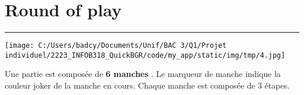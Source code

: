 \documentclass{scrartcl}%
\begin{document}
%
\sectionfont{\color{mygreen}}%
\subsectionfont{\color{mygreen}}%
\subsubsectionfont{\color{mygreen}}%
\section{ Round of play
}%
\label{sec:Roundofplay}%
\textcolor{mygreen}{\rule{18cm}{0.07cm}}\break%
%
\begin{center}\texttt{[image: C:/Users/badcy/Documents/Unif/BAC 3/Q1/Projet individuel/2223\_INFOB318\_QuickBGR/code/my\_app/static/img/tmp/4.jpg]}\end{center}%

%
Une partie est composée de %
\textcolor{mygreen}{%
\textbf{6 manches}%
}%
. Le marqueur de manche indique la couleur joker de la manche en cours. Chaque manche est composée de 3 étapes.


%
\end{document}
